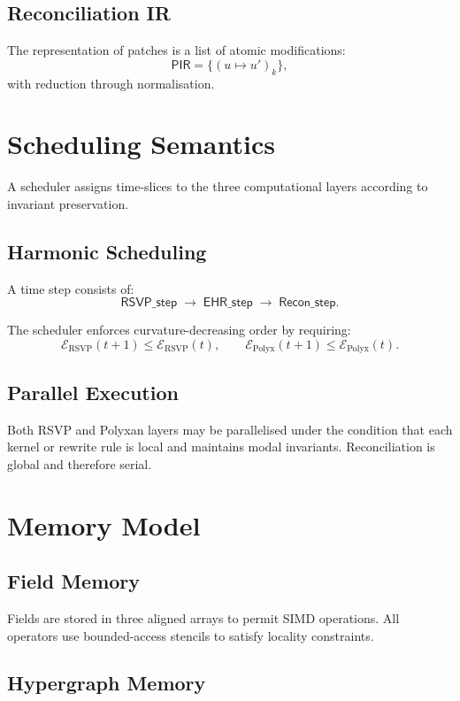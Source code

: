 \subsection{Reconciliation IR}

The representation of patches is a list of atomic modifications:
\[
\mathsf{PIR} = \{ (u \mapsto u')_k \},
\]
with reduction through normalisation.

\section{Scheduling Semantics}

A scheduler assigns time-slices to the three computational layers according to invariant preservation.

\subsection{Harmonic Scheduling}

A time step consists of:
\[
\mathsf{RSVP\_step} \;\rightarrow\; \mathsf{EHR\_step} \;\rightarrow\; \mathsf{Recon\_step}.
\]

The scheduler enforces curvature-decreasing order by requiring:
\[
\mathcal{E}_{\mathrm{RSVP}}(t{+}1) \le \mathcal{E}_{\mathrm{RSVP}}(t),
\qquad
\mathcal{E}_{\mathrm{Polyx}}(t{+}1) \le \mathcal{E}_{\mathrm{Polyx}}(t).
\]

\subsection{Parallel Execution}

Both RSVP and Polyxan layers may be parallelised under the condition that each kernel or rewrite rule is local and maintains modal invariants.  
Reconciliation is global and therefore serial.

\section{Memory Model}

\subsection{Field Memory}

Fields are stored in three aligned arrays to permit SIMD operations.  
All operators use bounded-access stencils to satisfy locality constraints.

\subsection{Hypergraph Memory}

